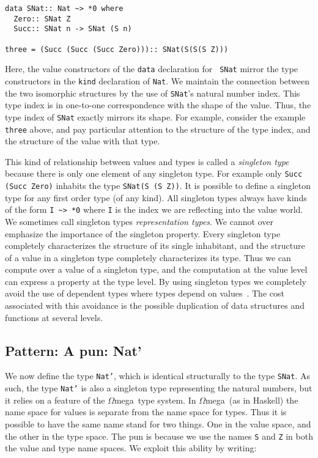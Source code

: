 \documentclass[11pt,twoside,A4]{llncs}
\newcommand{\om}{\emph{$\Omega$}mega}
\begin{document}
{\small
\begin{verbatim}
data SNat:: Nat ~> *0 where
  Zero:: SNat Z
  Succ:: SNat n -> SNat (S n)
  
three = (Succ (Succ (Succ Zero))):: SNat(S(S(S Z)))
\end{verbatim}}

\noindent
Here, the value constructors of the {\tt data} declaration for {\tt
SNat} mirror the type constructors in the {\tt kind} declaration of
{\tt Nat}.  We maintain the connection
between the two isomorphic structures by the use of {\tt SNat}'s natural
number index. This type index is in one-to-one correspondence with
the shape of the value. Thus, the type index of {\tt SNat} exactly
mirrors its shape. For example, consider the
example {\tt three} above, and pay particular attention to the
structure of the type index, and the structure of the value with that
type.
 
This kind of relationship between values and types
is called a {\it singleton type} because there is only one
element of any singleton type. For example only {\tt Succ (Succ Zero)}
inhabits the type {\tt SNat(S (S Z))}. It is possible to define a
singleton type for any first order type (of any kind). All singleton
types always have kinds of the form \verb+I ~> *0+ where {\tt I} is the
index we are reflecting into the value world. We sometimes call
singleton types {\em representation types}. We cannot over emphasize
the importance of the singleton property. Every singleton type
completely characterizes the structure of its single inhabitant, and
the structure of a value in a singleton type completely characterizes
its type. Thus we can compute over a value of a singleton type, and the
computation at the value level can express a property at the type
level.
By using singleton types we completely avoid the use of dependent
types where types depend on values~\cite{StoneHar00,Shao:2002:TSC}.
The cost associated with this avoidance is the possible duplication
of data structures and functions at several levels.



\subsection{Pattern: A pun: Nat'} \label{nat'}
We now define the type {\tt Nat'},
which is identical structurally to the type {\tt SNat}. As such, the type {\tt Nat'} is
also a singleton type representing the natural numbers, but it relies on a
feature of the \om\ type system. In \om\ (as in Haskell) the name space for values
is separate from the name space for types. Thus it is possible to have the same
name stand for two things. One in the value space, and the other in the type
space. The pun is because we use the names {\tt S} and {\tt Z} in both the
value and type name spaces. We exploit this ability by writing:
\end{document}
